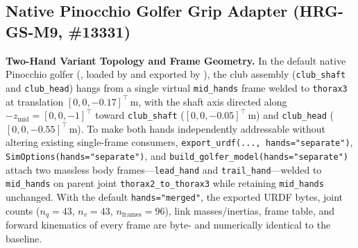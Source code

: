 \documentclass[11pt,a4paper]{article}
\begin{document}
\subsection{Native Pinocchio Golfer Grip Adapter (HRG-GS-M9, \#13331)}
\textbf{Two-Hand Variant Topology and Frame Geometry.}
In the default native Pinocchio golfer (, loaded by  and exported by ), the club assembly (\texttt{club\_shaft} and \texttt{club\_head}) hangs from a single virtual \texttt{mid\_hands} frame welded to \texttt{thorax3} at translation $[0, 0, -0.17]^{\top}\,\mathrm{m}$, with the shaft axis directed along $-z_{\mathrm{mid}} = [0, 0, -1]^{\top}$ toward \texttt{club\_shaft} ($[0, 0, -0.05]^{\top}\,\mathrm{m}$) and \texttt{club\_head} ($[0, 0, -0.55]^{\top}\,\mathrm{m}$).
To make both hands independently addressable without altering existing single-frame consumers, \texttt{export\_urdf(..., hands="separate")}, \texttt{SimOptions(hands="separate")}, and \texttt{build\_golfer\_model(hands="separate")} attach two massless body frames---\texttt{lead\_hand} and \texttt{trail\_hand}---welded to \texttt{mid\_hands} on parent joint \texttt{thorax2\_to\_thorax3} while retaining \texttt{mid\_hands} unchanged. With the default \texttt{hands="merged"}, the exported URDF bytes, joint counts ($n_q = 43$, $n_v = 43$, $n_{\mathrm{frames}} = 96$), link masses/inertias, frame table, and forward kinematics of every frame are byte- and numerically identical to the baseline.
\end{document}
